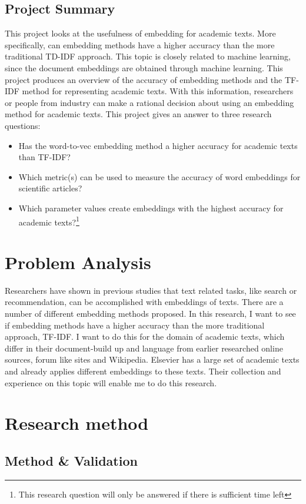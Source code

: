 \documentclass[10pt,a4paper]{article}
\begin{document}
\subsection{Project Summary}
This project looks at the usefulness of embedding for academic texts. More specifically, can embedding methods have a higher accuracy than the more traditional TD-IDF approach. This topic is closely related to machine learning, since the document embeddings are obtained through machine learning. This project produces an overview of the accuracy of embedding methods and the TF-IDF method for representing academic texts. With this information, researchers or people from industry can make a rational decision about using an embedding method for academic texts. This project gives an answer to three research questions:
\begin{itemize}
\item{Has the word-to-vec embedding method a higher accuracy for academic texts than TF-IDF?}
\item{Which metric(s) can be used to measure the accuracy of word embeddings for scientific articles?}
\item{Which parameter values create embeddings with the highest accuracy for academic texts?\footnote{This research question will only be answered if there is sufficient time left}}
\end{itemize}
\section{Problem Analysis}
Researchers have shown in previous studies that text related tasks, like search or recommendation, can be accomplished with embeddings of texts. There are a number of different embedding methods proposed. In this research, I want to see if embedding methods have a higher accuracy than the more traditional approach, TF-IDF. I want to do this for the domain of academic texts, which differ in their document-build up and language from earlier researched online sources, forum like sites and Wikipedia. Elsevier has a large set of academic texts and already applies different embeddings to these texts. Their collection and experience on this topic will enable me to do this research.

\section{Research method}
\subsection{Method \& Validation}
\end{document}
